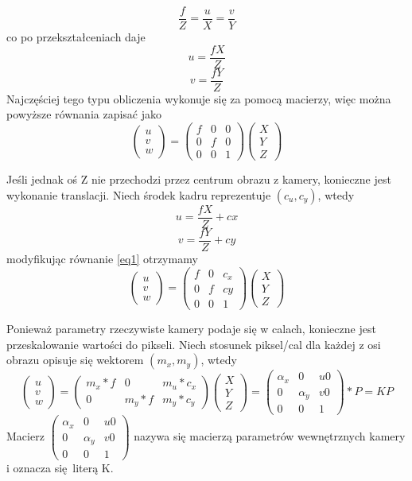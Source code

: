 \documentclass[12pt,twoside,polish]{article}
\begin{document}
$$ \frac{f}{Z} = \frac{u}{X} = \frac{v}{Y} $$
co po przekształceniach daje
$$ u = \frac{fX}{Z}$$
$$ v = \frac{fY}{Z} $$
Najczęściej tego typu obliczenia wykonuje się za pomocą macierzy, więc można powyższe równania zapisać jako
\begin{equation}
	\label{eq1}
	\begin{pmatrix} u \\ v \\ w \end{pmatrix}
	=
	\begin{pmatrix} f & 0 & 0 \\ 0 & f & 0 \\ 0 & 0 & 1 \end{pmatrix}
	\begin{pmatrix} X \\ Y \\ Z \end{pmatrix}
\end{equation}

Jeśli jednak oś Z nie przechodzi przez centrum obrazu z kamery, konieczne jest wykonanie translacji. Niech środek kadru reprezentuje $(c_u, c_y)$, wtedy
$$u=\frac{fX}{Z} + cx$$
$$v=\frac{fY}{Z} + cy$$
modyfikując równanie \ref{eq1} otrzymamy
$$
\begin{pmatrix} u \\ v \\ w \end{pmatrix}
=
\begin{pmatrix} f & 0 & c_x \\ 0 & f & cy \\ 0 & 0 & 1\end{pmatrix}
\begin{pmatrix} X \\ Y \\ Z \end{pmatrix}
$$

Ponieważ parametry rzeczywiste kamery podaje się w calach, konieczne jest przeskalowanie wartości do pikseli. Niech stosunek piksel/cal dla każdej z osi obrazu opisuje się wektorem $(m_x, m_y)$, wtedy 
$$
\begin{pmatrix} u \\ v \\ w \end{pmatrix}
=
\begin{pmatrix} m_x*f & 0 & m_u*c_x \\ 0 & m_y*f & m_y*c_y \end{pmatrix}
\begin{pmatrix} X \\ Y \\ Z \end{pmatrix}
=
\begin{pmatrix} \alpha _x & 0 & u0 \\ 0 & \alpha _y & v0 \\ 0 & 0 & 1\end{pmatrix}
*P = KP
$$
Macierz $\begin{pmatrix} \alpha _x & 0 & u0 \\ 0 & \alpha _y & v0 \\ 0 & 0 & 1\end{pmatrix}$ nazywa się macierzą parametrów wewnętrznych kamery i oznacza się literą K.
\end{document}

